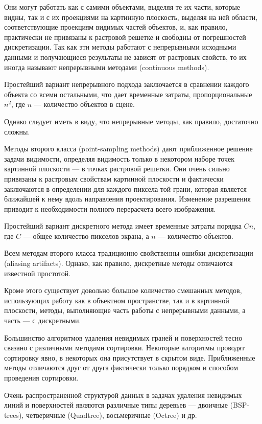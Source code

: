 Они могут работать как с самими объектами, выделяя те их части, которые видны, так и с их проекциями на картинную плоскость, выделяя на ней области, соответствующие проекциям видимых частей объектов, и, как правило, практически не привязаны к растровой решетке и свободны от погрешностей дискретизации. Так как эти методы работают с непрерывными исходными данными и получающиеся результаты не зависят от растровых свойств, то их иногда называют непрерывными методами (continuous methods).

Простейший вариант непрерывного подхода заключается в сравнении каждого объекта со всеми остальными, что дает временные затраты, пропорциональные \( n^2 \), где \( n \) — количество объектов в сцене.

Однако следует иметь в виду, что непрерывные методы, как правило, достаточно сложны.

Методы второго класса (point-sampling methods) дают приближенное решение задачи видимости, определяя видимость только в некотором наборе точек картинной плоскости — в точках растровой решетки. Они очень сильно привязаны к растровым свойствам картинной плоскости и фактически заключаются в определении для каждого пиксела той грани, которая является ближайшей к нему вдоль направления проектирования. Изменение разрешения приводит к необходимости полного перерасчета всего изображения.

Простейший вариант дискретного метода имеет временные затраты порядка \( Cn \), где \( C \) — общее количество пикселов экрана, а \( n \) — количество объектов.

Всем методам второго класса традиционно свойственны ошибки дискретизации (aliasing artifacts). Однако, как правило, дискретные методы отличаются известной простотой.

Кроме этого существует довольно большое количество смешанных методов, использующих работу как в объектном пространстве, так и в картинной плоскости, методы, выполняющие часть работы с непрерывными данными, а часть — с дискретными.

Большинство алгоритмов удаления невидимых граней и поверхностей тесно связано с различными методами сортировки. Некоторые алгоритмы проводят сортировку явно, в некоторых она присутствует в скрытом виде. Приближенные методы отличаются друг от друга фактически только порядком и способом проведения сортировки.

Очень распространенной структурой данных в задачах удаления невидимых линий и поверхностей являются различные типы деревьев — двоичные (BSP-trees), четверичные (Quadtree), восьмеричные (Octree) и др.

